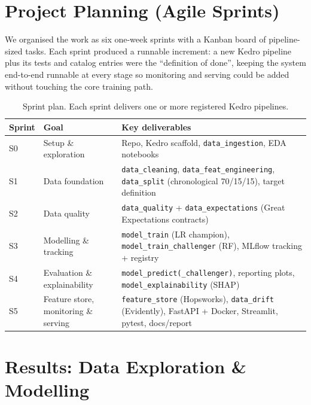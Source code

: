 \documentclass[12pt]{article}
\begin{document}
\section{Project Planning (Agile Sprints)}

We organised the work as six one-week sprints with a Kanban board of pipeline-sized tasks. Each sprint produced a runnable increment: a new Kedro pipeline plus its tests and catalog entries were the ``definition of done'', keeping the system end-to-end runnable at every stage so monitoring and serving could be added without touching the core training path.

\vspace{-3pt}
\begin{table}[H]
\centering\small
\caption{Sprint plan. Each sprint delivers one or more registered Kedro pipelines.}
\label{tab:sprints}
\begin{tabularx}{\textwidth}{p{1.0cm}p{4.4cm}X}
\toprule
\textbf{Sprint} & \textbf{Goal} & \textbf{Key deliverables} \\
\midrule
S0 & Setup \& exploration & Repo, Kedro scaffold, \texttt{data\_ingestion}, EDA notebooks \\
S1 & Data foundation & \texttt{data\_cleaning}, \texttt{data\_feat\_engineering}, \texttt{data\_split} (chronological 70/15/15), target definition \\
S2 & Data quality & \texttt{data\_quality} + \texttt{data\_expectations} (Great Expectations contracts) \\
S3 & Modelling \& tracking & \texttt{model\_train} (LR champion), \texttt{model\_train\_challenger} (RF), MLflow tracking + registry \\
S4 & Evaluation \& explainability & \texttt{model\_predict(\_challenger)}, reporting plots, \texttt{model\_explainability} (SHAP) \\
S5 & Feature store, monitoring \& serving & \texttt{feature\_store} (Hopsworks), \texttt{data\_drift} (Evidently), FastAPI + Docker, Streamlit, pytest, docs/report \\
\bottomrule
\end{tabularx}
\end{table}

\section{Results: Data Exploration \& Modelling}
\end{document}

